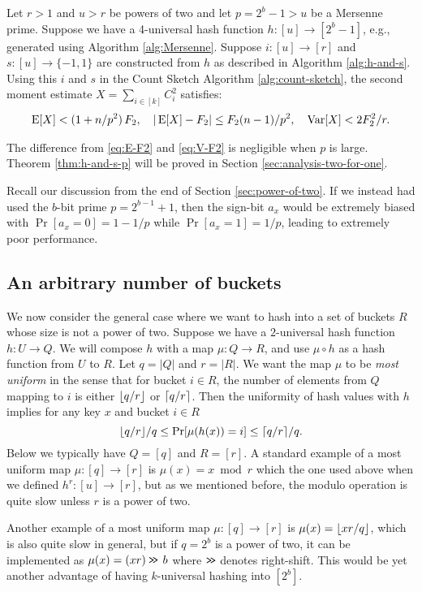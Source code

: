\begin{theorem}\label{thm:h-and-s-p}
	Let $r>1$ and $u>r$ be powers of two and let $p=2^b-1>u$ be a
	Mersenne prime.
	Suppose we have a 4-universal hash function $h:[u]\to[2^b-1]$, e.g.,
	generated using Algorithm \ref{alg:Mersenne}. Suppose
	$i:[u]\to[r]$ and
	$s:[u]\to\{-1,1\}$ are constructed from $h$ as described in
	Algorithm \ref{alg:h-and-s}. Using this $i$ and $s$
	in the Count Sketch Algorithm \ref{alg:count-sketch}, the second moment
	estimate $X=\sum_{i\in[k]} C_i^2$ satisfies:
	\begin{align*}
		\operatorname*{E}[X] < (1+n/p^2)\,F_2,
		\quad
		|\operatorname*{E}[X] - F_2 | \le F_2 (n - 1)/p^2,
		\quad
		\operatorname*{Var}[X]< 2F_2^2/r.
	\end{align*}
\end{theorem}
The difference from \eqref{eq:E-F2} and \eqref{eq:V-F2}
is negligible when $p$ is large. Theorem \ref{thm:h-and-s-p} will be
proved in Section \ref{sec:analysis-two-for-one}.

Recall our discussion from the end of Section
\ref{sec:power-of-two}. If we instead had used the $b$-bit prime
$p=2^{b-1}+1$, then the sign-bit $a_x$ would be extremely biased with
$\Pr[a_x=0]=1-1/p$ while $\Pr[a_x=1]=1/p$, leading to extremely poor
performance.


\subsection{An arbitrary number of buckets}\label{sec:most-uniform}
We now consider the general case where we want to hash into a set of
buckets $R$ whose size is not a power of two.  Suppose we have a
$2$-universal hash function $h:U\to Q$.  We will compose $h$ with a
map $\mu:Q\to R$, and use $\mu\circ h$ as a hash function from $U$ to
$R$.  Let $q=|Q|$ and $r=|R|$.  We want the map $\mu$ to be \emph{most
	uniform} in the sense that for bucket $i\in R$, the number of
elements from $Q$ mapping to $i$ is either $\lfloor {q/r} \rfloor$ or
$\lceil {q/r}\rceil$.  Then the uniformity of hash values with $h$ implies for
any key $x$ and bucket $i\in R$ \[\lfloor {q/r} \rfloor/q\leq
	\Pr[\mu(h(x))=i]\leq \lceil {q/r}\rceil/q.\] Below we typically have $Q=[q]$
and $R=[r]$.  A standard example of a most uniform map $\mu:[q]\to[r]$
is $\mu(x)=x\bmod r$ which the one used above when we defined
$h^r:[u]\to[r]$, but as we mentioned before, the modulo operation is
quite slow unless $r$ is a power of two.

Another example of a most uniform map $\mu:[q]\to[r]$
is $\mu(x)=\lfloor {xr/q} \rfloor$,
which is also quite slow in general, but if $q=2^b$ is a power of two,
it can be implemented as $\mu(x)=(xr)\mathbin{\texttt{>\!>}}\,b$ where
$\mathbin{\texttt{>\!>}}$ denotes right-shift. This would be yet another advantage
of having $k$-universal hashing into $[2^b]$.

